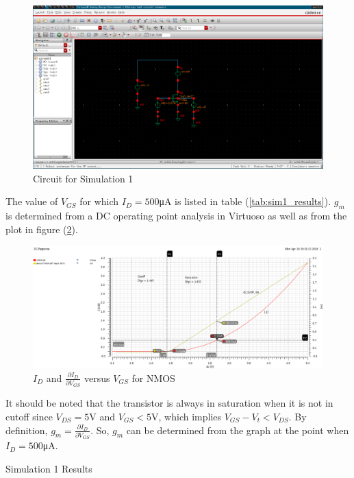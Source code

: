 \FloatBarrier

\begin{figure}[h!]
	\centering
	\includegraphics[scale=0.3]{./images/circuit1.PNG}
	\caption{Circuit for Simulation 1}
	\label{fig:circuit1}
\end{figure}

\FloatBarrier

The value of $V_{GS}$ for which $I_{D} = 500$\si{\micro\ampere} is listed in table (\ref{tab:sim1_results}).
$g_{m}$ is determined from a DC operating point analysis in Virtuoso as well as from the plot in figure (\ref{fig:id_vs_vgs}).

\FloatBarrier

\begin{figure}[h!]
	\centering
	\includegraphics[scale=0.45]{./images/500ua_point.PNG}
	\caption{$I_{D}$ and $\frac{\partial I_{D}}{\partial V_{GS}}$ versus $V_{GS}$ for NMOS}
	\label{fig:id_vs_vgs}
\end{figure}

\FloatBarrier

It should be noted that the transistor is always in saturation when it is not in cutoff since $V_{DS} = 5$\si{\volt} and $V_{GS} < 5$\si{\volt}, which implies $V_{GS} - V_{t} < V_{DS}$.
By definition, $g_{m} = \frac{\partial I_{D}}{\partial V_{GS}}$.
So, $g_{m}$ can be determined from the graph at the point when $I_{D} = 500$\si{\micro\ampere}.

\FloatBarrier

\begin{table}[h!]
	\centering
	\caption{Simulation 1 Results}
	\label{tab:sim1_results}
\end{table}

\FloatBarrier
